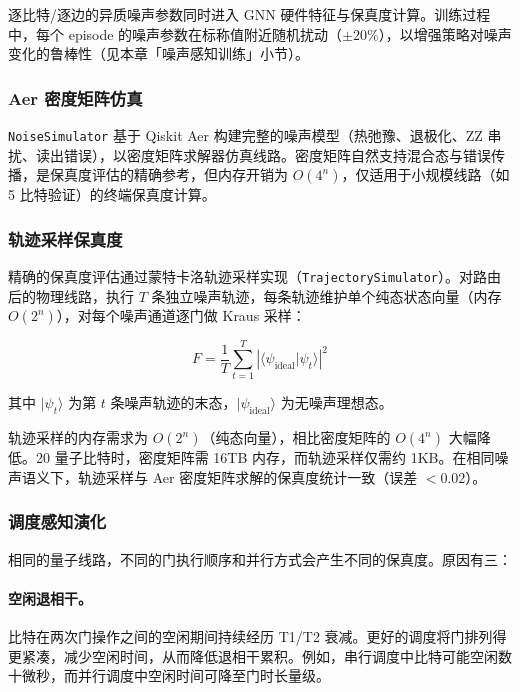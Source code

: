 逐比特/逐边的异质噪声参数同时进入 GNN 硬件特征与保真度计算。训练过程中，每个 episode 的噪声参数在标称值附近随机扰动（$\pm 20\%$），以增强策略对噪声变化的鲁棒性（见本章「噪声感知训练」小节）。

\subsubsection{Aer 密度矩阵仿真}

\texttt{NoiseSimulator} 基于 Qiskit Aer 构建完整的噪声模型（热弛豫、退极化、ZZ 串扰、读出错误），以密度矩阵求解器仿真线路。密度矩阵自然支持混合态与错误传播，是保真度评估的精确参考，但内存开销为 $O(4^n)$，仅适用于小规模线路（如 5 比特验证）的终端保真度计算。

\subsubsection{轨迹采样保真度}

精确的保真度评估通过蒙特卡洛轨迹采样实现（\texttt{TrajectorySimulator}）。对路由后的物理线路，执行 $T$ 条独立噪声轨迹，每条轨迹维护单个纯态状态向量（内存 $O(2^n)$），对每个噪声通道逐门做 Kraus 采样：

\begin{equation}
F = \frac{1}{T} \sum_{t=1}^{T} \left| \langle \psi_{\text{ideal}} | \psi_t \rangle \right|^2
\end{equation}

其中 $|\psi_t\rangle$ 为第 $t$ 条噪声轨迹的末态，$|\psi_{\text{ideal}}\rangle$ 为无噪声理想态。

轨迹采样的内存需求为 $O(2^n)$（纯态向量），相比密度矩阵的 $O(4^n)$ 大幅降低。20 量子比特时，密度矩阵需 16TB 内存，而轨迹采样仅需约 1KB。在相同噪声语义下，轨迹采样与 Aer 密度矩阵求解的保真度统计一致（误差 $<0.02$）。

\subsubsection{调度感知演化}

相同的量子线路，不同的门执行顺序和并行方式会产生不同的保真度。原因有三：

\paragraph{空闲退相干。} 比特在两次门操作之间的空闲期间持续经历 T1/T2 衰减。更好的调度将门排列得更紧凑，减少空闲时间，从而降低退相干累积。例如，串行调度中比特可能空闲数十微秒，而并行调度中空闲时间可降至门时长量级。

